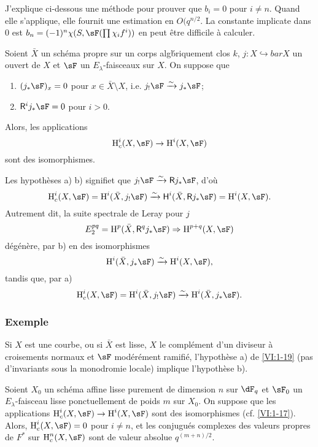 J'explique ci-dessous une m\'ethode pour prouver que $b_i=0$ pour $i\ne n$. 
Quand elle s'applique, elle fournit une estimation en $O(q^{n/2}$. La constante 
implicate dans $0$ est $b_n=(-1)^n \chi(S,\sF(\prod \chi_i f^i))$ en peut 
\^etre difficile \`a calculer. 





\begin{proposition_}\label{VI:1-19}
Soient $\bar X$ un sch\'ema propre sur un corps alg\'briquement clos $k$, 
$j:X\hookrightarrow bar X$ un ouvert de $X$ et $\sF$ un $E_\lambda$-faisceaux 
sur $X$. On suppose que 
\begin{enumerate}[\indent a)]
  \item $(j_\ast\sF)_x = 0$ pour $x\in \bar X\setminus X$, i.e. 
    $j_!\sF\iso j_\ast\sF$; 
  \item $\R^i j_\ast \sF = 0$ pour $i>0$.
\end{enumerate}
Alors, les applications 
\[
  \h_c^i(X,\sF) \to \h^i(X,\sF)
\]
sont des isomorphismes. 
\end{proposition_}

Les hypoth\`eses a) b) signifiet que $j_! \sF \iso \R j_\ast \sF$, d'o\`u 
\[
  \h_c^i(X,\sF) = \h^i(\bar X,j_!\sF) \iso \hh^i(\bar X,\R j_\ast \sF) = \h^i(X,\sF) \text{.}
\]
Autrement dit, la suite spectrale de Leray pour $j$ 
\[
  E_2^{pq} = \h^p(\bar X,\R^q j_\ast \sF) \Rightarrow \h^{p+q}(X,\sF) 
\]
d\'eg\'en\`ere, par b) en des isomorphismes 
\[
  \h^i(\bar X,j_\ast\sF) \iso \h^i(X,\sF) \text{,}
\]
tandis que, par a) 
\[
  \h_c^i(X,\sF) = \h^i(\bar X,j_!\sF) \iso \h^i(\bar X,j_\ast\sF) \text{.}
\]





\subsubsection{Exemple}\label{VI:1-9-1}

Si $X$ est une courbe, ou si $\bar X$ est lisse, $X$ le compl\'ement d'un 
diviseur \`a croisements normaux et $\sF$ mod\'er\'ement ramifi\'e, 
l'hypoth\`ese a) de \ref{VI:1-19} (pas d'invariants sous la monodromie locale) 
implique l'hypoth\`ese b). 





\begin{proposition_}\label{VI:1-20}
Soient $X_0$ un sch\'ema affine lisse purement de dimension $n$ sur $\dF_q$ et 
$\sF_0$ un $E_\lambda$-faisceau lisse ponctuellement de poids $m$ sur $X_0$. On 
suppose que les applications $\h_c^i(X,\sF) \to \h^i(X,\sF)$ sont des 
isomorphismes (cf. \ref{VI:1-17}). Alors, $\h_c^i(X,\sF) = 0$ pour $i\ne n$, et 
les conjugu\'es complexes des valeurs propres de $F^\ast$ sur $\h_c^n(X,\sF)$ 
sont de valeur absolue $q^{(m+n)/2}$. 
\end{proposition_}


